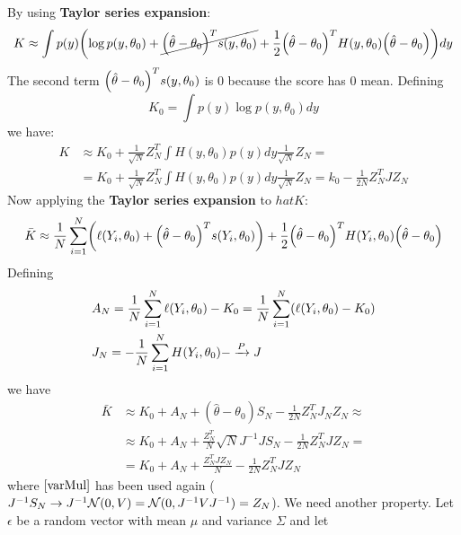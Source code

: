 \documentclass[12pt, letterpaper]{article}
\theoremstyle{definition}
\DeclarePairedDelimiter\autobracket{(}{)}
\newcommand{\br}[1]{\autobracket*{#1}}
\begin{document}
By using \textbf{Taylor series expansion}:
\begin{equation}
K \approx \int p(y) \br{\log p(y, \theta_0) + \cancel{\br{\hat{\theta} - \theta_0}^Ts(y,\theta_0)}+\frac{1}{2}\br{\hat{\theta} - \theta_0}^TH(y,\theta_0)\br{\hat{\theta} - \theta_0}} dy
\end{equation}
The second term $\br{\hat{\theta} - \theta_0}^Ts(y,\theta_0)$ is $0$ because the score has $0$ mean. Defining 
\begin{equation}
K_0  = \int  p(y) \log p(y, \theta_0)dy
\end{equation}
we have:
\begin{equation}
\begin{aligned}
K &\approx K_0 + \frac{1}{\sqrt{N}}Z_N^T \int H(y,\theta_0) p(y) dy \frac{1}{\sqrt{N}}Z_N  = \\
& =K_0 + \frac{1}{\sqrt{N}}Z_N^T \int H(y,\theta_0) p(y) dy \frac{1}{\sqrt{N}}Z_N = k_0 -\frac{1}{2N} Z_N^TJZ_N
\end{aligned}
\end{equation}
Now applying the \textbf{Taylor series expansion} to $hat{K}$:
\begin{equation}
\bar{K}  \approx \frac{1}{N} \sum_{i=1}^N \br{\ell(Y_i,\theta_0) + \br{\hat{\theta} - \theta_0}^Ts(Y_i,\theta_0)} + \frac{1}{2}\br{\hat{\theta} - \theta_0}^TH(Y_i,\theta_0)\br{\hat{\theta} - \theta_0}
\end{equation}
Defining 
\begin{equation}
\begin{aligned}
&A_N = \frac{1}{N} \sum_{i=1}^N \ell(Y_i, \theta_0) - K_0 = \frac{1}{N} \sum_{i=1}^N \br{\ell(Y_i, \theta_0) - K_0}\\
&J_N = -\frac{1}{N} \sum_{i=1}^NH(Y_i,\theta_0) - \xrightarrow{P} J
\end{aligned}
\end{equation}
we have
\begin{equation}
\begin{aligned}
\bar{K} &\approx K_0 + A_N + (\hat{\theta} - \theta_0)S_N -\frac{1}{2N} Z_N^TJ_NZ_N \approx\\
&\approx K_0 + A_N + \frac{Z_N^T}{N}\sqrt{N}J^{-1}JS_N -\frac{1}{2N} Z_N^TJZ_N  = \\
&= K_0 + A_N + \frac{Z_N^TJZ_N}{N} -\frac{1}{2N} Z_N^TJZ_N
\end{aligned}
\end{equation}
where $\autoref{varMul}$ has been used again ($J^{-1}S_N \rightarrow J^{-1}\CMcal{N}(0,V)= \CMcal{N}(0,J^{-1}VJ^{-1}) = Z_N$).
We need another property. Let $\epsilon$ be a random vector with mean $\mu$ and variance $\Sigma$ and let
\end{document}
